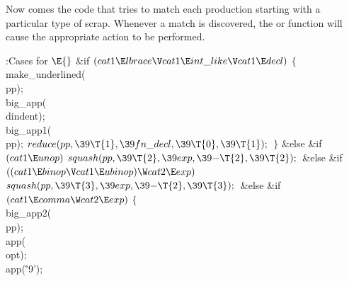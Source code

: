 Now comes the code that tries to match each production starting
with a particular type of scrap. Whenever a match is discovered,
the  or  function will cause the appropriate
action
to be performed.

\Y\B\4:Cases for \X${}\E{}$\6
\&{if} ${}(\\{cat1}\E\\{lbrace}\V\\{cat1}\E\\{int\_like}\V\\{cat1}\E%
\\{decl}){}$\5
${}\{{}$\1\6
\\{make\_underlined}(\\{pp});\6
\\{big\_app}(\\{dindent});\6
\\{big\_app1}(\\{pp});\6
${}\\{reduce}(\\{pp},\39\T{1},\39\\{fn\_decl},\39\T{0},\39\T{1});{}$\6
\4${}\}{}$\2\6
\&{else} \&{if} ${}(\\{cat1}\E\\{unop}){}$\1\5
${}\\{squash}(\\{pp},\39\T{2},\39\\{exp},\39{-}\T{2},\39\T{2});{}$\2\6
\&{else} \&{if} ${}((\\{cat1}\E\\{binop}\V\\{cat1}\E\\{ubinop})\W\\{cat2}\E%
\\{exp}){}$\1\5
${}\\{squash}(\\{pp},\39\T{3},\39\\{exp},\39{-}\T{2},\39\T{3});{}$\2\6
\&{else} \&{if} ${}(\\{cat1}\E\\{comma}\W\\{cat2}\E\\{exp}){}$\5
${}\{{}$\1\6
\\{big\_app2}(\\{pp});\6
\\{app}(\\{opt});\6
\\{app}(\.{'9'});\6

